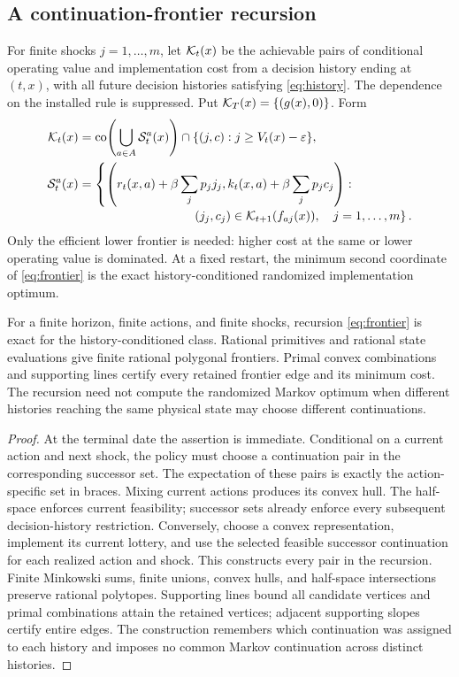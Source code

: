 \subsection{A continuation-frontier recursion}
For finite shocks $j=1,\ldots,m$, let $\mathcal K_t(x)$ be the achievable pairs of conditional operating value and implementation cost from a decision history ending at $(t,x)$, with all future decision histories satisfying \eqref{eq:history}. The dependence on the installed rule is suppressed. Put $\mathcal K_T(x)=\{(g(x),0)\}$. Form
\begin{equation}\label{eq:frontier}
 \begin{aligned}
 \cK_t(x)&=\operatorname{co}\!\left(\bigcup_{a\in A}\mathcal S_t^a(x)\right)
       \cap\{(j,c):j\geq V_t(x)-\varepsilon\},\\
 \mathcal S_t^a(x)&=\left\{\left(r_t(x,a)+\beta\sum_jp_jj_j,
       k_t(x,a)+\beta\sum_jp_jc_j\right):\right.\\[-2pt]
 &\hspace{32mm}\left.(j_j,c_j)\in\cK_{t+1}(f_{aj}(x)),\quad j=1,\ldots,m\right\}.
 \end{aligned}
\end{equation}
Only the efficient lower frontier is needed: higher cost at the same or lower operating value is dominated. At a fixed restart, the minimum second coordinate of \eqref{eq:frontier} is the exact history-conditioned randomized implementation optimum.

\begin{theorem}\label{thm:frontier}
For a finite horizon, finite actions, and finite shocks, recursion \eqref{eq:frontier} is exact for the history-conditioned class. Rational primitives and rational state evaluations give finite rational polygonal frontiers. Primal convex combinations and supporting lines certify every retained frontier edge and its minimum cost. The recursion need not compute the randomized Markov optimum when different histories reaching the same physical state may choose different continuations.
\end{theorem}
\begin{proof}
At the terminal date the assertion is immediate. Conditional on a current action and next shock, the policy must choose a continuation pair in the corresponding successor set. The expectation of these pairs is exactly the action-specific set in braces. Mixing current actions produces its convex hull. The half-space enforces current feasibility; successor sets already enforce every subsequent decision-history restriction. Conversely, choose a convex representation, implement its current lottery, and use the selected feasible successor continuation for each realized action and shock. This constructs every pair in the recursion. Finite Minkowski sums, finite unions, convex hulls, and half-space intersections preserve rational polytopes. Supporting lines bound all candidate vertices and primal combinations attain the retained vertices; adjacent supporting slopes certify entire edges. The construction remembers which continuation was assigned to each history and imposes no common Markov continuation across distinct histories.\end{proof}

